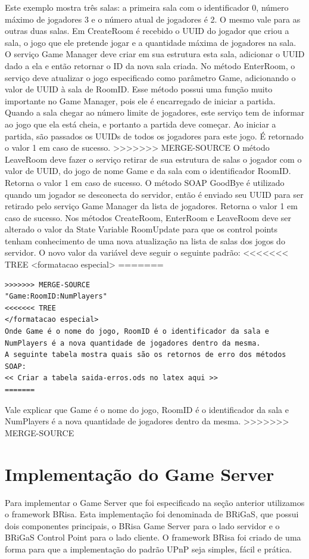 \documentclass[a4paper]{sbgames}               %
\begin{document}
Este exemplo mostra três salas: a primeira sala com o identificador 0, número máximo de jogadores 3 e o número atual de jogadores é 2. O mesmo vale para as outras duas salas.
Em CreateRoom é recebido o UUID do jogador que criou a sala, o jogo que ele pretende jogar e a quantidade máxima de jogadores na sala. O serviço Game Manager deve criar em sua estrutura esta sala, adicionar o UUID dado a ela e então retornar o ID da nova sala criada.
No método EnterRoom, o serviço deve atualizar o jogo especificado como parâmetro Game, adicionando o valor de UUID à sala de RoomID. Esse método possui uma função muito importante no Game Manager, pois ele é encarregado de iniciar a partida. Quando a sala chegar ao número limite de jogadores, este serviço tem de informar ao jogo que ela está cheia, e portanto a partida deve começar. Ao iniciar a partida, são passados os UUIDs de todos os jogadores para este jogo. É retornado o valor 1 em caso de sucesso.
>>>>>>> MERGE-SOURCE
O método LeaveRoom deve fazer o serviço retirar de sua estrutura de salas o jogador com o valor de UUID, do jogo de nome Game e da sala com o identificador RoomID. Retorna o valor 1 em caso de sucesso.
O método SOAP GoodBye é utilizado quando um jogador se desconecta do servidor, então é enviado seu UUID para ser retirado pelo serviço Game Manager da lista de jogadores. Retorna o valor 1 em caso de sucesso.
Nos métodos CreateRoom, EnterRoom e LeaveRoom deve ser alterado o valor da State Variable RoomUpdate para que os control points tenham conhecimento de uma nova atualização na lista de salas dos jogos do servidor. O novo valor da variável deve seguir o seguinte padrão:
<<<<<<< TREE
<formatacao especial>
=======

\begin{verbatim}
>>>>>>> MERGE-SOURCE
"Game:RoomID:NumPlayers"
<<<<<<< TREE
</formatacao especial>
Onde Game é o nome do jogo, RoomID é o identificador da sala e NumPlayers é a nova quantidade de jogadores dentro da mesma.
A seguinte tabela mostra quais são os retornos de erro dos métodos SOAP:
<< Criar a tabela saida-erros.ods no latex aqui >>
=======
\end{verbatim}

Vale explicar que Game é o nome do jogo, RoomID é o identificador da sala e NumPlayers é a nova quantidade de jogadores dentro da mesma.
>>>>>>> MERGE-SOURCE

\section{Implementação do Game Server}
Para implementar o Game Server que foi especificado na seção anterior utilizamos o framework BRisa. Esta implementação foi denominada de BRiGaS, que possui dois componentes principais, o BRisa Game Server para o lado servidor e o BRiGaS Control Point para o lado cliente.
O framework BRisa foi criado de uma forma para que a implementação do padrão UPnP seja simples, fácil e prática.
\end{document}
